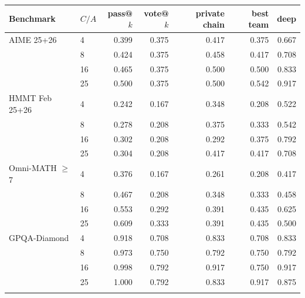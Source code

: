 \begin{tabular}{llrrrrr}
\toprule
Benchmark & $C/A$ & pass@$k$ & vote@$k$ & private chain & best team & deep \\ \midrule
AIME 25+26 & 4 & 0.399 & 0.375 & 0.417 & 0.375 & 0.667 \\
 & 8 & 0.424 & 0.375 & 0.458 & 0.417 & 0.708 \\
 & 16 & 0.465 & 0.375 & 0.500 & 0.500 & 0.833 \\
 & 25 & 0.500 & 0.375 & 0.500 & 0.542 & 0.917 \\
\addlinespace
HMMT Feb 25+26 & 4 & 0.242 & 0.167 & 0.348 & 0.208 & 0.522 \\
 & 8 & 0.278 & 0.208 & 0.375 & 0.333 & 0.542 \\
 & 16 & 0.302 & 0.208 & 0.292 & 0.375 & 0.792 \\
 & 25 & 0.304 & 0.208 & 0.417 & 0.417 & 0.708 \\
\addlinespace
Omni-MATH $\geq$7 & 4 & 0.376 & 0.167 & 0.261 & 0.208 & 0.417 \\
 & 8 & 0.467 & 0.208 & 0.348 & 0.333 & 0.458 \\
 & 16 & 0.553 & 0.292 & 0.391 & 0.435 & 0.625 \\
 & 25 & 0.609 & 0.333 & 0.391 & 0.435 & 0.500 \\
\addlinespace
GPQA-Diamond & 4 & 0.918 & 0.708 & 0.833 & 0.708 & 0.833 \\
 & 8 & 0.973 & 0.750 & 0.792 & 0.750 & 0.792 \\
 & 16 & 0.998 & 0.792 & 0.917 & 0.750 & 0.917 \\
 & 25 & 1.000 & 0.792 & 0.833 & 0.917 & 0.875 \\
\addlinespace
\bottomrule
\end{tabular}
